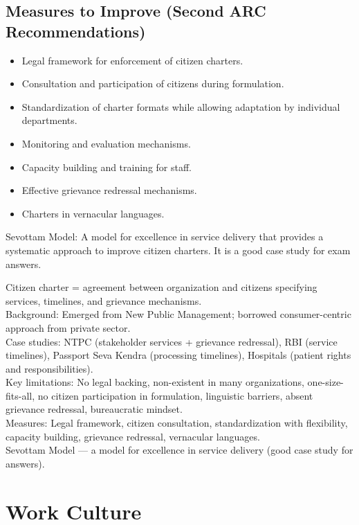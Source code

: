 \subsection{Measures to Improve (Second ARC Recommendations)}
\begin{itemize}
\item Legal framework for enforcement of citizen charters.
\item Consultation and participation of citizens during formulation.
\item Standardization of charter formats while allowing adaptation by individual departments.
\item Monitoring and evaluation mechanisms.
\item Capacity building and training for staff.
\item Effective grievance redressal mechanisms.
\item Charters in vernacular languages.
\end{itemize}

\begin{GovtPolicy}
Sevottam Model: A model for excellence in service delivery that provides a systematic approach to improve citizen charters. It is a good case study for exam answers.
\end{GovtPolicy}

\begin{QuickRevision}
Citizen charter = agreement between organization and citizens specifying services, timelines, and grievance mechanisms.\\
Background: Emerged from New Public Management; borrowed consumer-centric approach from private sector.\\
Case studies: NTPC (stakeholder services + grievance redressal), RBI (service timelines), Passport Seva Kendra (processing timelines), Hospitals (patient rights and responsibilities).\\
Key limitations: No legal backing, non-existent in many organizations, one-size-fits-all, no citizen participation in formulation, linguistic barriers, absent grievance redressal, bureaucratic mindset.\\
Measures: Legal framework, citizen consultation, standardization with flexibility, capacity building, grievance redressal, vernacular languages.\\
Sevottam Model --- a model for excellence in service delivery (good case study for answers).
\end{QuickRevision}

\section{Work Culture}


